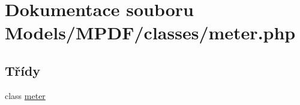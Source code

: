 \hypertarget{meter_8php}{\section{Dokumentace souboru Models/\-M\-P\-D\-F/classes/meter.php}
\label{meter_8php}
}
\subsection*{Třídy}
\begin{DoxyCompactItemize}
\item 
class \hyperlink{classmeter}{meter}
\end{DoxyCompactItemize}
